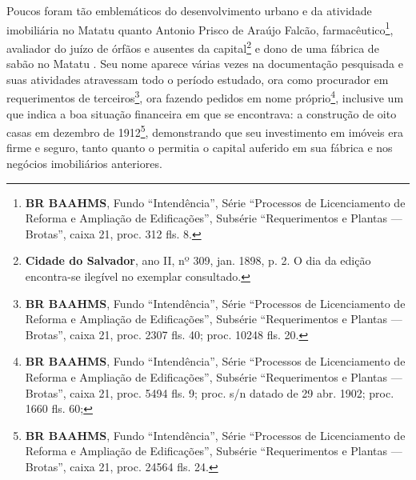
Poucos foram tão emblemáticos do desenvolvimento urbano e da atividade imobiliária no Matatu quanto Antonio Prisco de Araújo Falcão, farmacêutico\footnote{\textbf{BR BAAHMS}, Fundo ``Intendência'', Série ``Processos de Licenciamento de Reforma e Ampliação de Edificações'', Subsérie ``Requerimentos e Plantas --- Brotas'', caixa 21, proc. 312 fls. 8.}, avaliador do juízo de órfãos e ausentes da capital\footnote{\textbf{Cidade do Salvador}, ano II, nº 309, jan. 1898, p. 2. O dia da edição encontra-se ilegível no exemplar consultado.} e dono de uma fábrica de sabão no Matatu \cite[p.~2732]{laemmert_almanak_1914}. Seu nome aparece várias vezes na documentação pesquisada e suas atividades atravessam todo o período estudado, ora como procurador em requerimentos de terceiros\footnote{\textbf{BR BAAHMS}, Fundo ``Intendência'', Série ``Processos de Licenciamento de Reforma e Ampliação de Edificações'', Subsérie ``Requerimentos e Plantas --- Brotas'', caixa 21, proc. 2307 fls. 40; proc. 10248 fls. 20.}, ora fazendo pedidos em nome próprio\footnote{\textbf{BR BAAHMS}, Fundo ``Intendência'', Série ``Processos de Licenciamento de Reforma e Ampliação de Edificações'', Subsérie ``Requerimentos e Plantas --- Brotas'', caixa 21, proc. 5494 fls. 9; proc. s/n datado de 29 abr. 1902; proc. 1660 fls. 60; }, inclusive um que indica a boa situação financeira em que se encontrava: a construção de oito casas em dezembro de 1912\footnote{\textbf{BR BAAHMS}, Fundo ``Intendência'', Série ``Processos de Licenciamento de Reforma e Ampliação de Edificações'', Subsérie ``Requerimentos e Plantas --- Brotas'', caixa 21, proc. 24564 fls. 24.}, demonstrando que seu investimento em imóveis era firme e seguro, tanto quanto o permitia o capital auferido em sua fábrica e nos negócios imobiliários anteriores.

